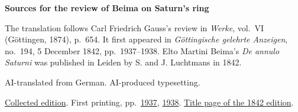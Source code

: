 \clearpage\thispagestyle{empty}
\begin{center}\Large\bfseries Sources for the review of Beima on Saturn’s ring\end{center}

The translation follows Carl Friedrich Gauss’s review in \emph{Werke}, vol.~VI (Göttingen, 1874), p.~654. It first appeared in \emph{Göttingische gelehrte Anzeigen}, no.~194, 5 December 1842, pp.~1937--1938. Elto Martini Beima’s \emph{De annulo Saturni} was published in Leiden by S. and J. Luchtmans in 1842.

AI-translated from German. AI-produced typesetting.

\href{https://gdz.sub.uni-goettingen.de/id/PPN236007467}{Collected edition}. First printing, pp.~\href{https://images.p.sub.uni-goettingen.de/iiif/image/gdz:PPN385030444_1842_2:00000899/full/2400,/0/default.jpg}{1937}, \href{https://images.p.sub.uni-goettingen.de/iiif/image/gdz:PPN385030444_1842_2:00000900/full/2400,/0/default.jpg}{1938}. \href{https://archive.org/details/deannulosaturni00beimgoog/page/n7/mode/1up}{Title page of the 1842 edition}.

\clearpage
